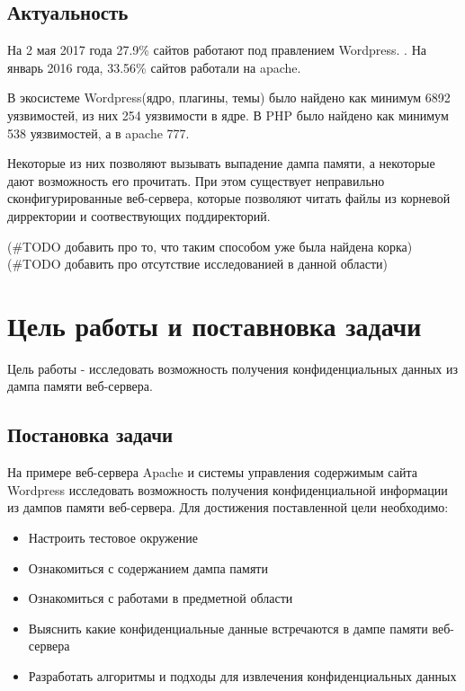 \documentclass[20pt]{article}
\begin{document}
\subsection{Актуальность}
На 2 мая 2017 года 27.9\% сайтов работают под правлением Wordpress.
\cite{number_of_wordpress_sites}. На январь 2016 года, 33.56\% сайтов работали
на apache\cite{number_of_apache_sites}.

В экосистеме Wordpress(ядро, плагины, темы) было найдено как минимум 6892
уязвимостей\cite{wordpress/vulnerablilities-list-all}, из них 254
уязвимости\cite{wordpress/vulnerabilities-list-core} в ядре. В PHP было
найдено как минимум 538\cite{php/vulnerabilities-list} уязвимостей, а в apache
777\cite{apache/vulnerabilities-list}.

Некоторые из них позволяют вызывать выпадение дампа памяти, а некоторые дают
возможность его прочитать. При этом существует неправильно сконфигурированные
веб-сервера, которые позволяют читать файлы из корневой дирректории и
соотвествующих поддиректорий.

(\#TODO добавить про то, что таким способом уже была найдена корка)
(\#TODO добавить про отсутствие исследованией в данной области)

\newpage

\section{Цель работы и поставновка задачи}
Цель работы - исследовать возможность получения конфиденциальных данных из
дампа памяти веб-сервера.

\subsection{Постановка задачи}
На примере веб-сервера Apache и системы управления содержимым сайта Wordpress
исследовать возможность получения конфиденциальной информации из дампов памяти
веб-сервера. Для достижения поставленной цели необходимо:

\begin{itemize}
  \item Настроить тестовое окружение
  \item Ознакомиться с содержанием дампа памяти
  \item Ознакомиться с работами в предметной области
  \item Выяснить какие конфиденциальные данные встречаются в дампе памяти веб-сервера
  \item Разработать алгоритмы и подходы для извлечения конфиденциальных данных
\end{itemize}
\end{document}
